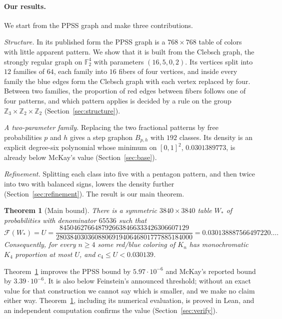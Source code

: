 \documentclass[11pt]{article}
\newtheorem{theorem}{Theorem}[section]
\theoremstyle{definition}
\theoremstyle{remark}
\newcommand{\F}{\mathcal F}
\newcommand{\Z}{\mathbb Z}
\newcommand{\FF}{\mathbb F}
\begin{document}
\paragraph{Our results.}
We start from the PPSS graph and make three contributions.

\emph{Structure.}
In its published form the PPSS graph is a $768\times768$ table of colors with little apparent pattern.
We show that it is built from the Clebsch graph, the strongly regular graph on $\FF_2^4$ with parameters $(16,5,0,2)$.
Its vertices split into $12$ families of $64$, each family into $16$ fibers of four vertices, and inside every family the blue edges form the Clebsch graph with each vertex replaced by four.
Between two families, the proportion of red edges between fibers follows one of four patterns, and which pattern applies is decided by a rule on the group $\Z_3\times\Z_2\times\Z_2$ (Section~\ref{sec:structure}).

\emph{A two-parameter family.}
Replacing the two fractional patterns by free probabilities $p$ and $h$ gives a step graphon $B_{p,h}$ with $192$ classes.
Its density is an explicit degree-six polynomial whose minimum on $[0,1]^2$, $0.0301389773$, is already below McKay's value (Section~\ref{sec:base}).

\emph{Refinement.}
Splitting each class into five with a pentagon pattern, and then twice into two with balanced signs, lowers the density further (Section~\ref{sec:refinement}).
The result is our main theorem.

\begin{theorem}[Main bound]
\label{thm:main}
There is a symmetric $3840\times3840$ table $W_*$ of probabilities with denominator $65536$ such that
\begin{equation}
\label{eq:mainvalue}
 \F(W_*)=U=\frac{8450462766487926638466333426306607129}{280384030360880691940646801777885184000}=0.030138887566497220\ldots.
\end{equation}
Consequently, for every $n\ge4$ some red/blue coloring of $K_n$ has monochromatic $K_4$ proportion at most $U$, and $c_4\le U<0.030139$.
\end{theorem}

Theorem~\ref{thm:main} improves the PPSS bound by $5.97\cdot10^{-6}$ and McKay's reported bound by $3.39\cdot10^{-6}$.
It is also below Feinstein's announced threshold; without an exact value for that construction we cannot say which is smaller, and we make no claim either way.
Theorem~\ref{thm:main}, including its numerical evaluation, is proved in Lean, and an independent computation confirms the value (Section~\ref{sec:verify}).
\end{document}
